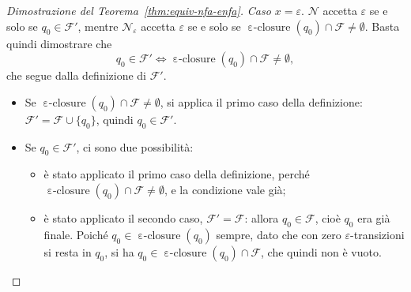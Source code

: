 \documentclass[a4paper, 11pt, oneside]{book}
\theoremstyle{formale}
\DeclareMathOperator{\eclosure}{\varepsilon\text{-}closure}
\begin{document}
\begin{proof}[Dimostrazione del Teorema~\ref{thm:equiv-nfa-enfa}]
        \textit{Caso $x = \varepsilon$}. $\mathcal{N}$ accetta $\varepsilon$ se e solo
        se $q_0 \in \mathcal{F}'$, mentre $\mathcal{N}_\varepsilon$ accetta
        $\varepsilon$ se e solo se $\eclosure(q_0) \cap \mathcal{F} \neq \emptyset$.
        Basta quindi dimostrare che
        \begin{equation*}
            q_0 \in \mathcal{F}' \iff \eclosure(q_0) \cap \mathcal{F} \neq \emptyset,
        \end{equation*}
        che segue dalla definizione di $\mathcal{F}'$.
        \begin{itemize}[leftmargin=3em]
            \item[($\Leftarrow$)] Se $\eclosure(q_0) \cap \mathcal{F} \neq \emptyset$, si
                applica il primo caso della definizione: $\mathcal{F}' = \mathcal{F} \cup
                \{q_0\}$, quindi $q_0 \in \mathcal{F}'$.
            \item[($\Rightarrow$)] Se $q_0 \in \mathcal{F}'$, ci sono due possibilit\`a:
                \begin{itemize}
                    \item \`e stato applicato il primo caso della definizione, perch\'e
                        $\eclosure(q_0) \cap \mathcal{F} \neq \emptyset$, e la condizione
                        vale gi\`a;
                    \item \`e stato applicato il secondo caso, $\mathcal{F}' =
                        \mathcal{F}$: allora $q_0 \in \mathcal{F}$, cio\`e $q_0$ era gi\`a
                        finale. Poich\'e $q_0 \in \eclosure(q_0)$ sempre, dato che con zero
                        $\varepsilon$-transizioni si resta in $q_0$, si ha
                        $q_0 \in \eclosure(q_0) \cap \mathcal{F}$, che quindi non \`e
                        vuoto.
                \end{itemize}
        \end{itemize}


\end{proof}
\end{document}

